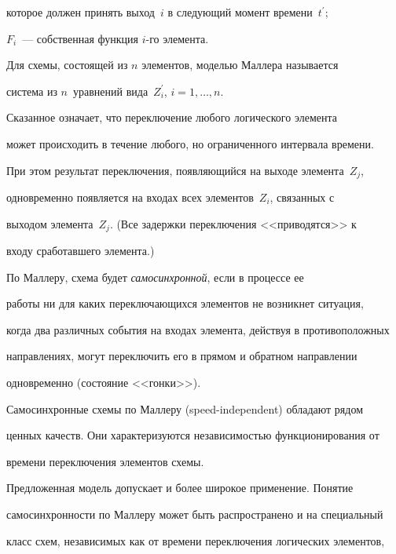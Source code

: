 которое должен принять выход~$i$ в следующий момент времени~$t^\prime$; 


$F_i$~--- собственная функция $i$-го элемента.


      


      Для схемы, состоящей из $n$ элементов, моделью Маллера называется 


система из $n$~уравнений вида~$Z^\prime_i$, $i = 1, \ldots ,n$.      


      


      Сказанное  означает, что переключение любого логического элемента 


может происходить в течение любого, но ограниченного интервала времени. 


При этом результат переключения, появляющийся на выходе элемента~$Z_j$, 


одновременно появляется на входах всех элементов~$Z_i$, связанных с 


выходом элемента~$Z_j$. (Все задержки переключения <<приводятся>> к 


входу сработавшего элемента.)


      


      По Маллеру, схема будет \textit{самосинхронной}, если в процессе ее 


работы ни для каких переключающихся элементов не возникнет ситуация, 


когда два различных события на входах элемента, действуя в противоположных 


направлениях, могут переключить его в прямом и обратном направлении 


одновременно (состояние <<гонки>>).


      


      Самосинхронные схемы по Маллеру (speed-independent) обладают рядом 


ценных качеств. Они характеризуются независимостью функционирования от 


времени переключения элементов схемы. 


      


      Предложенная модель допускает и более широкое применение. Понятие 


самосинхронности по Маллеру может быть распространено и на специальный 


класс схем, независимых как от времени переключения логических элементов, 


